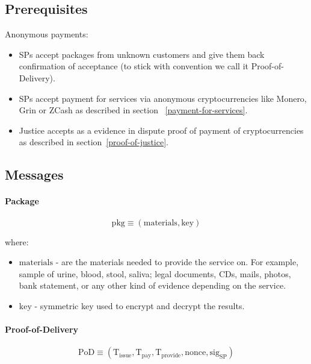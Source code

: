 \documentclass{ieeeaccess}
\begin{document}
\subsection{Prerequisites}

Anonymous payments:

\begin{itemize}

\item
  SPs accept packages from unknown customers and give them back
  confirmation of acceptance (to stick with convention we call it
  Proof-of-Delivery).
\item
  SPs accept payment for services via anonymous cryptocurrencies like
  Monero, Grin or ZCash as described in section ~\ref{payment-for-services}.
\item
  Justice accepts as a evidence in dispute proof of payment of
  cryptocurrencies as described in section~\ref{proof-of-justice}.
\end{itemize}

\subsection{Messages}\label{messages}

\paragraph{Package}\label{package}

$$\mathrm{pkg} \equiv (\mathrm{materials}, \mathrm{key})$$

where:

\begin{itemize}

\item $\mathrm{materials}$ - are the materials needed to provide the
  service on. For example, sample of urine, blood, stool, saliva; legal
  documents, CDs, mails, photos, bank statement, or any other kind of
  evidence depending on the service.
\item $\mathrm{key}$ - symmetric key used to encrypt and decrypt the
  results.
\end{itemize}

\paragraph{Proof-of-Delivery}\label{proof-of-delivery}

$$\mathrm{PoD} \equiv (\mathrm{T}_\mathrm{issue}, \mathrm{T}_\mathrm{pay}, \mathrm{T}_\mathrm{provide}, \mathrm{nonce}, \mathrm{sig}_\mathrm{SP})$$
\end{document}
